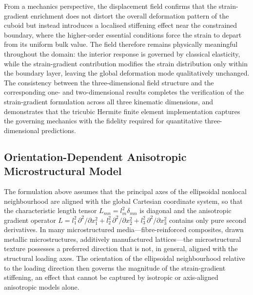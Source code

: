 \documentclass[final,3p,times,fleqn]{elsarticle}
\begin{document}
From a mechanics perspective, the displacement field confirms that the
strain-gradient enrichment does not distort the overall deformation
pattern of the cuboid but instead introduces a localised stiffening
effect near the constrained boundary, where the higher-order essential
conditions force the strain to depart from its uniform bulk value.
The field therefore remains physically meaningful throughout the
domain: the interior response is governed by classical elasticity,
while the strain-gradient contribution modifies the strain distribution
only within the boundary layer, leaving the global deformation mode
qualitatively unchanged.
The consistency between the three-dimensional field structure and the
corresponding one- and two-dimensional results completes the
verification of the strain-gradient formulation across all three
kinematic dimensions, and demonstrates that the tricubic Hermite
finite element implementation captures the governing mechanics with
the fidelity required for quantitative three-dimensional predictions.


\subsection{Orientation-Dependent Anisotropic Microstructural Model}
\label{sec:3D_orientation_model}

The formulation above assumes that the
principal axes of the ellipsoidal nonlocal neighbourhood are aligned
with the global Cartesian coordinate system, so that the characteristic
length tensor $L_{mn} = l_{m}^{2}
\delta_{mn}$ is diagonal and the anisotropic gradient operator
$L = l_{1}^{2}\,\partial^{2}/\partial x_{1}^{2}
 + l_{2}^{2}\,\partial^{2}/\partial x_{2}^{2}
 + l_{3}^{2}\,\partial^{2}/\partial x_{3}^{2}$
contains only pure second derivatives.
In many microstructured media---fibre-reinforced composites, drawn
metallic microstructures, additively manufactured lattices---the
microstructural texture possesses a preferred direction that is not,
in general, aligned with the structural loading axes.
The orientation of the ellipsoidal neighbourhood relative to the
loading direction then governs the magnitude of the strain-gradient
stiffening, an effect that cannot be captured by isotropic or
axis-aligned anisotropic models alone.
\end{document}
